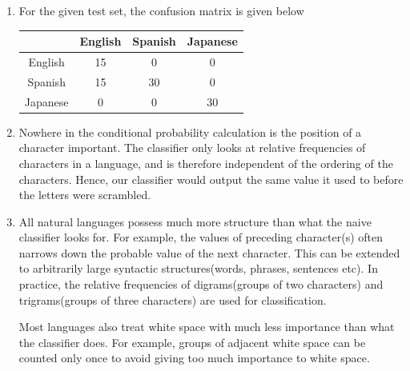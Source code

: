 \documentclass[11pt]{article}
\begin{document}
\begin{enumerate}
	\item For the given test set, the confusion matrix is
		given below
		
		\begin{tabular}{|c|c|c|c|}
		\hline
					          &English	&Spanish	&Japanese \\
		\hline
					English		&15				&0				&0				\\
					Spanish		&15				&30				&0				\\
					Japanese	&0				&0				&30				\\
		\hline
		\end{tabular}
	
	\item Nowhere in the conditional probability calculation is the position
		of a character important. The classifier only looks at relative
		frequencies of characters in a language, and is therefore independent
		of the ordering of the characters. Hence, our classifier would output
		the same value it used to before the letters were scrambled.
	
	\item All natural languages possess much more structure than what the
	naive classifier looks for. For example, the values of preceding character(s)
	often narrows down the probable value of the next character. This can
	be extended to arbitrarily large syntactic structures(words, phrases, sentences etc).
	In practice, the relative frequencies of digrams(groups of two characters)
	and trigrams(groups of three characters) are used for classification.
	
	Most languages also treat white space with much less importance than
	what the classifier does. For example, groups of adjacent white space
	can be counted only once to avoid giving too much importance to white space.
	
	\end{enumerate}
\end{document}
